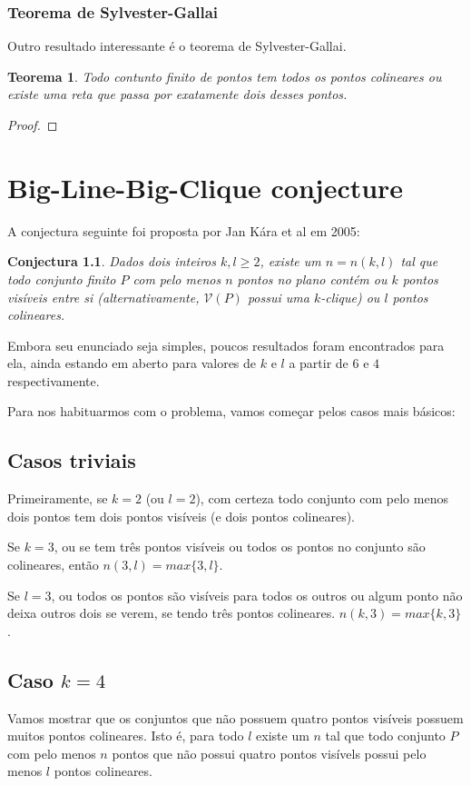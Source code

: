 \documentclass[a4paper]{book}
\newtheorem{conjectura}{Conjectura}
\newtheorem{teorema}{Teorema}
\begin{document}
\subsection{Teorema de Sylvester-Gallai}
Outro resultado interessante é o teorema de Sylvester-Gallai.
\begin{teorema}   
    Todo contunto finito de pontos tem todos os pontos colineares ou existe uma reta que passa por exatamente dois desses pontos.
\end{teorema}
\begin{proof}

\end{proof}

\chapter{Big-Line-Big-Clique conjecture}
A conjectura seguinte foi proposta por Jan Kára et al em 2005\cite{visibilitygraph}:
\begin{conjectura}\label{conj1}
    Dados dois inteiros $k,l\geq2$, existe um $n=n(k,l)$ tal que todo conjunto finito $P$ com pelo menos $n$ pontos no plano contém ou $k$ pontos visíveis entre si (alternativamente, $\mathcal V(P)$ possui uma $k$-clique) ou $l$ pontos colineares.
\end{conjectura}
Embora seu enunciado seja simples, poucos resultados foram encontrados para ela, ainda estando em aberto para valores de $k$ e $l$ a partir de $6$ e $4$ respectivamente.

Para nos habituarmos com o problema, vamos começar pelos casos mais básicos:

\section{Casos triviais}
Primeiramente, se $k=2$ (ou $l=2$), com certeza todo conjunto com pelo menos dois pontos tem dois pontos visíveis (e dois pontos colineares).

Se $k=3$, ou se tem três pontos visíveis ou todos os pontos no conjunto são colineares, então $n(3,l)=max\{3,l\}$.

Se $l=3$, ou todos os pontos são visíveis para todos os outros ou algum ponto não deixa outros dois se verem, se tendo três pontos colineares. $n(k,3) = max\{k,3\}$.


\section{Caso $k=4$}
Vamos mostrar que os conjuntos que não possuem quatro pontos visíveis possuem muitos pontos colineares. Isto é, para todo $l$ existe um $n$ tal que todo conjunto $P$ com pelo menos $n$ pontos que não possui quatro pontos visívels possui pelo menos $l$ pontos colineares.
\end{document}
